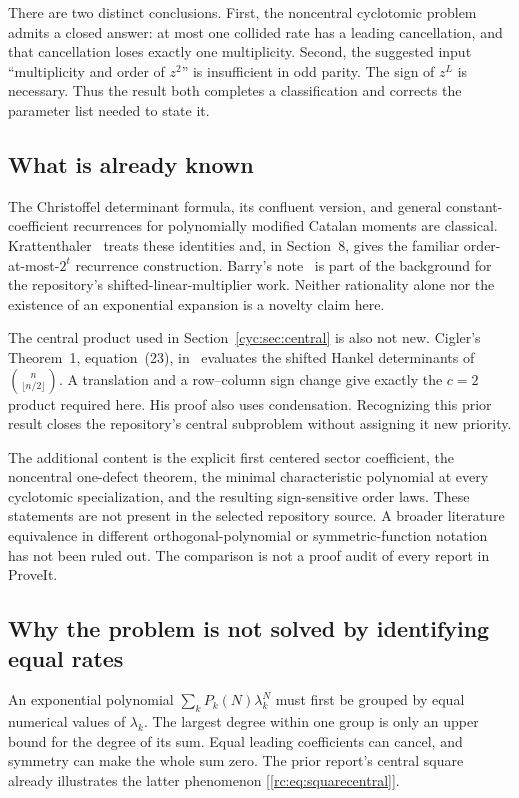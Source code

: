 \documentclass[11pt,a4paper]{article}
\numberwithin{equation}{section}
\theoremstyle{definition}
\theoremstyle{remark}
\begin{document}
There are two distinct conclusions.  First, the noncentral cyclotomic
problem admits a closed answer: at most one collided rate has a
leading cancellation, and that cancellation loses exactly one
multiplicity.  Second, the suggested input ``multiplicity and order of
$z^2$'' is insufficient in odd parity.  The sign of $z^L$ is necessary.
Thus the result both completes a classification and corrects the
parameter list needed to state it.

\subsection{What is already known}
The Christoffel determinant formula, its confluent version, and general
constant-coefficient recurrences for polynomially modified Catalan
moments are classical.  Krattenthaler~\cite{Krattenthaler2023} treats these
identities and, in Section~8, gives the familiar order-at-most-$2^t$
recurrence construction.  Barry's note~\cite{Barry2020} is part of the
background for the repository's shifted-linear-multiplier work.
Neither rationality alone nor the existence of an exponential expansion
is a novelty claim here.

The central product used in Section~\ref{cyc:sec:central} is also not new.
Cigler's Theorem~1, equation~(23), in~\cite{Cigler2021} evaluates the
shifted Hankel determinants of $\binom n{\lfloor n/2\rfloor}$.
A translation and a row--column sign change give exactly the
$c=2$ product required here.  His proof also uses condensation.
Recognizing this prior result closes the repository's central subproblem
without assigning it new priority.

The additional content is the explicit first centered sector
coefficient, the noncentral one-defect theorem, the minimal
characteristic polynomial at every cyclotomic specialization, and the
resulting sign-sensitive order laws.  These statements are not present
in the selected repository source.  A broader literature equivalence
in different orthogonal-polynomial or symmetric-function notation has
not been ruled out.  The comparison is not a proof audit of every report
in ProveIt.

\subsection{Why the problem is not solved by identifying equal rates}
An exponential polynomial
$\sum_k P_k(N)\lambda_k^N$ must first be grouped by equal numerical
values of $\lambda_k$.  The largest degree within one group is only an
upper bound for the degree of its sum.  Equal leading coefficients can
cancel, and symmetry can make the whole sum zero.  The prior report's
central square already illustrates the latter phenomenon
[\eqref{rc:eq:squarecentral}].
\end{document}
